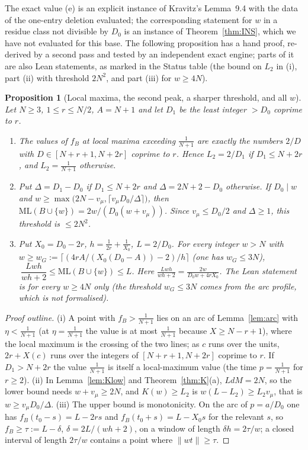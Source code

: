 \documentclass[11pt]{article}
\newtheorem{proposition}[theorem]{Proposition}
\theoremstyle{definition}
\theoremstyle{remark}
\newcommand{\nd}[1]{\lVert #1\rVert}
\newcommand{\ML}{\mathrm{ML}}
\begin{document}
The exact value (e) is an explicit instance of Kravitz's Lemma~9.4 with the data of the one-entry deletion evaluated; the corresponding statement for $w$ in a residue class not divisible by $D_0$ is an instance of Theorem~\ref{thm:INS}, which we have not evaluated for this base. The following proposition has a hand proof, re-derived by a second pass and tested by an independent exact engine; parts of it are also Lean statements, as marked in the Status table (the bound on $L_2$ in (i), part (ii) with threshold $2N^2$, and part (iii) for $w\ge4N$).

\begin{proposition}[Local maxima, the second peak, a sharper threshold, and all $w$]\label{prop:G2}
Let $N\ge3$, $1\le r\le N/2$, $A=N+1$ and let $D_1$ be the least integer $>D_0$ coprime to $r$.
\begin{enumerate}[label=(\roman*),nosep]
\item The values of $f_B$ at local maxima exceeding $\frac1{N+1}$ are exactly the numbers $2/D$ with $D\in[N+r+1,N+2r]$ coprime to $r$. Hence $L_2=2/D_1$ if $D_1\le N+2r$, and $L_2=\frac1{N+1}$ otherwise.
\item Put $\Delta=D_1-D_0$ if $D_1\le N+2r$ and $\Delta=2N+2-D_0$ otherwise. If $D_0\mid w$ and $w\ge\max\bigl(2N-v_\mu,\lceil v_\mu D_0/\Delta\rceil\bigr)$, then $\ML(B\cup\{w\})=2w/(D_0(w+v_\mu))$. Since $v_\mu\le D_0/2$ and $\Delta\ge1$, this threshold is $\le2N^2$.
\item Put $X_0=D_0-2r$, $h=\frac1{2r}+\frac1{X_0}$, $L=2/D_0$. For every integer $w>N$ with $w\ge w_G:=\lceil(4rA/(X_0(D_0-A))-2)/h\rceil$ (one has $w_G\le3N$), $\ \dfrac{Lwh}{wh+2}\le\ML(B\cup\{w\})\le L$. Here $\frac{Lwh}{wh+2}=\frac{2w}{D_0w+4rX_0}$. The Lean statement is for every $w\ge4N$ only (the threshold $w_G\le3N$ comes from the arc profile, which is not formalised).
\end{enumerate}
\end{proposition}
\begin{proof}[Proof outline]
(i) A point with $f_B>\frac1{N+1}$ lies on an arc of Lemma~\ref{lem:arc} with $\eta<\frac1{N+1}$ (at $\eta=\frac1{N+1}$ the value is at most $\frac1{N+1}$ because $X\ge N-r+1$), where the local maximum is the crossing of the two lines; as $c$ runs over the units, $2r+X(c)$ runs over the integers of $[N+r+1,N+2r]$ coprime to $r$. If $D_1>N+2r$ the value $\frac1{N+1}$ is itself a local-maximum value (the time $p=\frac1{N+1}$ for $r\ge2$). (ii) In Lemma~\ref{lem:Klow} and Theorem~\ref{thm:K}(a), $LdM=2N$, so the lower bound needs $w+v_\mu\ge2N$, and $K(w)\ge L_2$ is $w(L-L_2)\ge L_2v_\mu$, that is $w\ge v_\mu D_0/\Delta$. (iii) The upper bound is monotonicity. On the arc of $p=a/D_0$ one has $f_B(t_0-s)=L-2rs$ and $f_B(t_0+s)=L-X_0s$ for the relevant $s$, so $f_B\ge\tau:=L-\delta$, $\delta=2L/(wh+2)$, on a window of length $\delta h=2\tau/w$; a closed interval of length $2\tau/w$ contains a point where $\nd{wt}\ge\tau$.
\end{proof}
\end{document}
